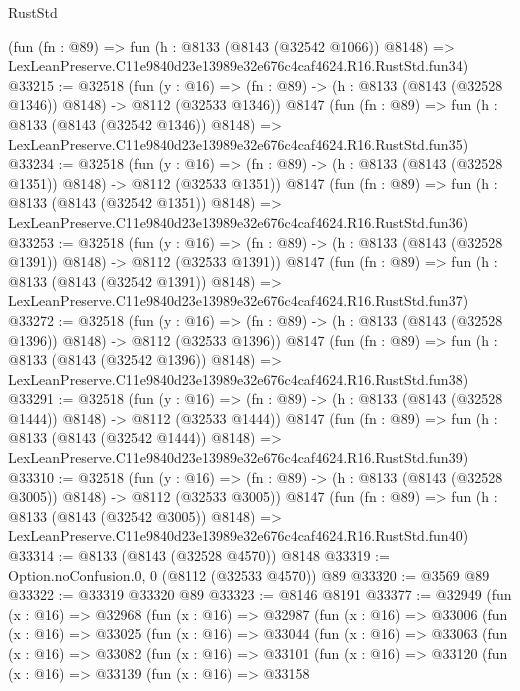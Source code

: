 \begin{lexlean}{RustStd}
\begin{coremodule}
    (fun (fn : @89) =>
    fun (h : @8133 (@8143 (@32542 @1066)) @8148) =>
    LexLeanPreserve.C11e9840d23e13989e32e676c4caf4624.R16.RustStd.fun34)
@33215 := @32518
    (fun (y : @16) =>
    (fn : @89) -> (h : @8133 (@8143 (@32528 @1346)) @8148) -> @8112 (@32533 @1346))
    @8147
    (fun (fn : @89) =>
    fun (h : @8133 (@8143 (@32542 @1346)) @8148) =>
    LexLeanPreserve.C11e9840d23e13989e32e676c4caf4624.R16.RustStd.fun35)
@33234 := @32518
    (fun (y : @16) =>
    (fn : @89) -> (h : @8133 (@8143 (@32528 @1351)) @8148) -> @8112 (@32533 @1351))
    @8147
    (fun (fn : @89) =>
    fun (h : @8133 (@8143 (@32542 @1351)) @8148) =>
    LexLeanPreserve.C11e9840d23e13989e32e676c4caf4624.R16.RustStd.fun36)
@33253 := @32518
    (fun (y : @16) =>
    (fn : @89) -> (h : @8133 (@8143 (@32528 @1391)) @8148) -> @8112 (@32533 @1391))
    @8147
    (fun (fn : @89) =>
    fun (h : @8133 (@8143 (@32542 @1391)) @8148) =>
    LexLeanPreserve.C11e9840d23e13989e32e676c4caf4624.R16.RustStd.fun37)
@33272 := @32518
    (fun (y : @16) =>
    (fn : @89) -> (h : @8133 (@8143 (@32528 @1396)) @8148) -> @8112 (@32533 @1396))
    @8147
    (fun (fn : @89) =>
    fun (h : @8133 (@8143 (@32542 @1396)) @8148) =>
    LexLeanPreserve.C11e9840d23e13989e32e676c4caf4624.R16.RustStd.fun38)
@33291 := @32518
    (fun (y : @16) =>
    (fn : @89) -> (h : @8133 (@8143 (@32528 @1444)) @8148) -> @8112 (@32533 @1444))
    @8147
    (fun (fn : @89) =>
    fun (h : @8133 (@8143 (@32542 @1444)) @8148) =>
    LexLeanPreserve.C11e9840d23e13989e32e676c4caf4624.R16.RustStd.fun39)
@33310 := @32518
    (fun (y : @16) =>
    (fn : @89) -> (h : @8133 (@8143 (@32528 @3005)) @8148) -> @8112 (@32533 @3005))
    @8147
    (fun (fn : @89) =>
    fun (h : @8133 (@8143 (@32542 @3005)) @8148) =>
    LexLeanPreserve.C11e9840d23e13989e32e676c4caf4624.R16.RustStd.fun40)
@33314 := @8133 (@8143 (@32528 @4570)) @8148
@33319 := Option.noConfusion.{0, 0} (@8112 (@32533 @4570)) @89
@33320 := @3569 @89
@33322 := @33319 @33320 @89
@33323 := @8146 @8191
@33377 := @32949
    (fun (x : @16) =>
    @32968
      (fun (x : @16) =>
      @32987
        (fun (x : @16) =>
        @33006
          (fun (x : @16) =>
          @33025
            (fun (x : @16) =>
            @33044
              (fun (x : @16) =>
              @33063
                (fun (x : @16) =>
                @33082
                  (fun (x : @16) =>
                  @33101
                    (fun (x : @16) =>
                    @33120
                      (fun (x : @16) =>
                      @33139
                        (fun (x : @16) =>
                        @33158

\end{coremodule}
\end{lexlean}
